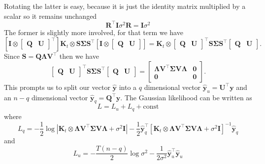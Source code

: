 Rotating the latter is easy, because it is just the identity matrix multiplied by a scalar so it remains unchanged 
\begin{equation} \label{eq:RotatingNoise}
\mathbf{R}^\top\mathbf{I}\sigma^2 \mathbf{R}= \mathbf{I}\sigma^2
\end{equation}
The former is slightly more involved, for that term we have
\begin{equation} \label{eq:svdONK}
\left[\mathbf{I}\otimes \begin{bmatrix}\mathbf{Q} & \mathbf{U}\end{bmatrix}^\top \right]\mathbf{K}_t \otimes 
\mathbf{S}\boldsymbol{\Sigma}\mathbf{S}^\top
\left[ \mathbf{I} \otimes \begin{bmatrix}\mathbf{Q} & \mathbf{U}\end{bmatrix}\right]
=
\mathbf{K}_t \otimes \begin{bmatrix}\mathbf{Q} & \mathbf{U}\end{bmatrix}^\top 
\mathbf{S} \boldsymbol{\Sigma}\mathbf{S}^\top \begin{bmatrix}\mathbf{Q} & \mathbf{U}\end{bmatrix}.
\end{equation}
Since $\mathbf{S} = \mathbf{Q}\boldsymbol{\Lambda}\mathbf{V}^\top$ then we have
\begin{equation} \label{eq:yqprime}
  \begin{bmatrix}\mathbf{Q} & \mathbf{U}\end{bmatrix}^\top \mathbf{S}\boldsymbol{\Sigma}\mathbf{S}^\top\begin{bmatrix}\mathbf{Q} & \mathbf{U}\end{bmatrix} 
    = 
  \begin{bmatrix}\boldsymbol{\Lambda} \mathbf{V}^\top \boldsymbol{\Sigma}\mathbf{V} \boldsymbol{\Lambda} &\mathbf{0} \\ \mathbf{0} & \mathbf{0}\end{bmatrix}.
\end{equation}
This prompts us to split our vector $\hat{\mathbf{y}}$ into a $q$ dimensional vector $\hat{\mathbf{y}}_u = \mathbf{U}^\top \mathbf{y}$ and an $n-q$ dimensional vector $\hat{\mathbf{y}}_q =\mathbf{Q}^\top \mathbf{y}$. The Gaussian likelihood can be written as
\begin{equation} \label{eq:LikelihoodParts}
L = L_u + L_q + \text{const}
\end{equation}
where
\begin{equation} \label{eq:Lq}
L_q = -\frac{1}{2} \log |\mathbf{K}_t\otimes
	  \boldsymbol{\Lambda}\mathbf{V}^\top\boldsymbol{\Sigma}\mathbf{V}\boldsymbol{\Lambda}+\sigma^2\mathbf{I}| 
	- \frac{1}{2} \hat{\mathbf{y}}_q^\top \left[\mathbf{K}_t\otimes 
	  \boldsymbol{\Lambda}\mathbf{V}^\top\boldsymbol{\Sigma}\mathbf{V}\boldsymbol{\Lambda}+\sigma^2\mathbf{I}\right]^{-1} \hat{\mathbf{y}}_q
\end{equation}
and
\begin{equation} \label{eq:Lu}
L_u = -\frac{T(n-q)}{2} \log \sigma^2  -\frac{1}{2\sigma^2} \hat{\mathbf{y}}_u^\top \hat{\mathbf{y}}_u
\end{equation}

